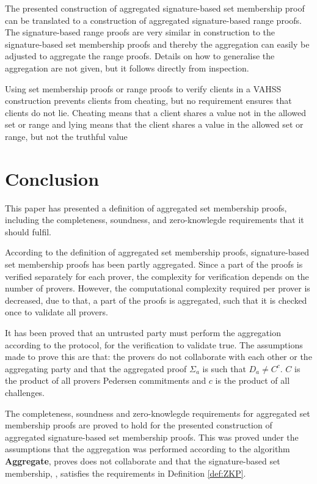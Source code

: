 The presented construction of aggregated signature-based set membership proof can be translated to a construction of aggregated signature-based range proofs. The signature-based range proofs are very similar in construction to the signature-based set membership proofs and thereby the aggregation can easily be adjusted to aggregate the range proofs. Details on how to generalise the aggregation are not given, but it follows directly from inspection.
 
Using set membership proofs or range proofs to verify clients in a VAHSS construction prevents clients from cheating, but no requirement ensures that clients do not lie. Cheating means that a client shares a value not in the allowed set or range and lying means that the client shares a value in the allowed set or range, but not the truthful value

\section*{Conclusion}

This paper has presented a definition of aggregated set membership proofs, including the completeness, soundness, and zero-knowlegde requirements that it should fulfil.

According to the definition of aggregated set membership proofs, signature-based set membership proofs has been partly aggregated. Since a part of the proofs is verified separately for each prover, the complexity for verification depends on the number of provers. However, the computational complexity required per prover is decreased, due to that, a part of the proofs is aggregated, such that it is checked once to validate all provers. 

It has been proved that an untrusted party must perform the aggregation according to the protocol, for the verification to validate true. The assumptions made to prove this are that: the provers do not collaborate  with each other or the aggregating party and that the aggregated proof $\Sigma_a$ is such that $D_a\neq C^c$. $C$ is the product of all provers Pedersen commitments and $c$ is the product of all challenges. 

The completeness, soundness and zero-knowlegde requirements for aggregated set membership proofs are proved to hold for the presented construction of aggregated signature-based set membership proofs. This was proved under the assumptions that the aggregation was performed according to the algorithm \textbf{Aggregate}, proves does not collaborate and that the signature-based set membership, \cite{RANGE-SET}, satisfies the requirements in Definition \ref{def:ZKP}. 



